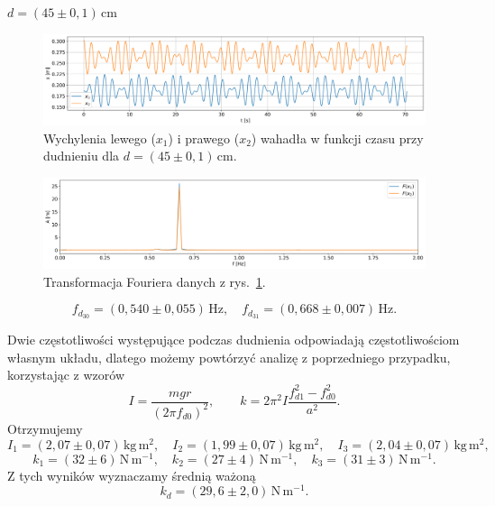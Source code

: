 \documentclass[12pt]{article}
\begin{document}
\(d = (45 \pm 0{,}1)\,\mathrm{cm}\)
\begin{figure}[H]
	\centering
	\includegraphics[width=\linewidth]{beats_3}
	\caption{Wychylenia lewego (\(x_1\)) i prawego (\(x_2\)) wahadła w funkcji czasu przy dudnieniu dla \(d = (45 \pm 0{,}1)\,\mathrm{cm}\).}
	\label{fig:beats_2}
\end{figure}
\begin{figure}[H]
	\centering
	\includegraphics[width=\linewidth]{counterphase_3_fft}
	\caption{Transformacja Fouriera danych z rys.~\ref{fig:beats_2}.}
	\label{fig:coutner_phase_2_fft}
\end{figure}
\[
	f_{d_{30}} = (0{,}540 \pm 0{,}055)\,\mathrm{Hz}, \quad
	f_{d_{31}} = (0{,}668 \pm 0{,}007)\,\mathrm{Hz}.
\]

Dwie częstotliwości występujące podczas dudnienia odpowiadają częstotliwościom własnym układu\cite{skrypt}, dlatego możemy powtórzyć analizę z poprzedniego przypadku, korzystając z wzorów
\[
	I = \frac{mgr}{(2\pi f_{d0})^2}, \qquad
	k = 2\pi^2 I \frac{f_{d1}^2 - f_{d0}^2}{a^2}.
\]
Otrzymujemy
\[
	I_1 = (2{,}07 \pm 0{,}07)\,\mathrm{kg\,m^2}, \quad
	I_2 = (1{,}99 \pm 0{,}07)\,\mathrm{kg\,m^2}, \quad
	I_3 = (2{,}04 \pm 0{,}07)\,\mathrm{kg\,m^2},
\]
\[
	k_1 = (32 \pm 6)\,\mathrm{N\,m^{-1}}, \quad
	k_2 = (27 \pm 4)\,\mathrm{N\,m^{-1}}, \quad
	k_3 = (31 \pm 3)\,\mathrm{N\,m^{-1}}.
\]
Z tych wyników wyznaczamy średnią ważoną
\[
	k_d = (29{,}6 \pm 2{,}0)\,\mathrm{N\,m^{-1}}.
\]
\end{document}
